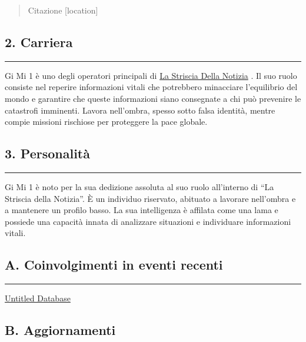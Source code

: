 \begin{quote}
Citazione {[}location{]}
\end{quote}

\subsection{2. Carriera}\label{carriera}

\begin{center}\rule{0.5\linewidth}{0.5pt}\end{center}

Gi Mi 1 è uno degli operatori principali di
\href{https://www.notion.so/La-Striscia-Della-Notizia-58157109cdb44626b1d92668711114d1?pvs=21}{La
Striscia Della Notizia} . Il suo ruolo consiste nel reperire
informazioni vitali che potrebbero minacciare l'equilibrio del mondo e
garantire che queste informazioni siano consegnate a chi può prevenire
le catastrofi imminenti. Lavora nell'ombra, spesso sotto falsa identità,
mentre compie missioni rischiose per proteggere la pace globale.

\subsection{3. Personalità}\label{personalituxe0}

\begin{center}\rule{0.5\linewidth}{0.5pt}\end{center}

Gi Mi 1 è noto per la sua dedizione assoluta al suo ruolo all'interno di
``La Striscia della Notizia''. È un individuo riservato, abituato a
lavorare nell'ombra e a mantenere un profilo basso. La sua intelligenza
è affilata come una lama e possiede una capacità innata di analizzare
situazioni e individuare informazioni vitali.

\subsection{A. Coinvolgimenti in eventi
recenti}\label{a.-coinvolgimenti-in-eventi-recenti}

\begin{center}\rule{0.5\linewidth}{0.5pt}\end{center}

\href{Untitled\%20Database\%2004658c200c5a4cedbb672aee61ba2af3.csv}{Untitled
Database}

\subsection{B. Aggiornamenti}\label{b.-aggiornamenti}

